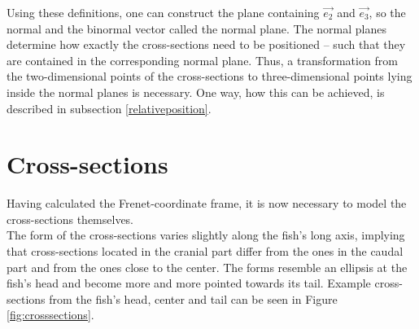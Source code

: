 Using these definitions, one can construct the plane containing $\vec{e_2}$ and $\vec{e_3}$, so the normal and the binormal vector called the normal plane. The normal planes determine how exactly the cross-sections need to be positioned -- such that they are contained in the corresponding normal plane. Thus, a transformation from the two-dimensional points of the cross-sections to three-dimensional points lying inside the normal planes is necessary. One way, how this can be achieved, is described in subsection \ref{relativeposition}.

\section{Cross-sections}
    \label{Cross sections}
    
Having calculated the Frenet-coordinate frame, it is now necessary to model the cross-sections themselves. \\
The form of the cross-sections varies slightly along the fish's long axis, implying that cross-sections located in the cranial part differ from the ones in the caudal part and from the ones close to the center. The forms resemble an ellipsis at the fish's head and become more and more pointed towards its tail. Example cross-sections from the fish's head, center and tail can be seen in Figure \ref{fig:crosssections}.

